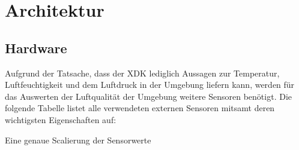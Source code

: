 
\chapter{Architektur}\label{cha:Architektur}
\section{Hardware}\label{sec:Hardware}
Aufgrund der Tatsache, dass der \acs{XDK} lediglich Aussagen zur Temperatur, Luftfeuchtigkeit und dem Luftdruck in der Umgebung liefern kann, werden für das Auswerten der Luftqualität der Umgebung weitere Sensoren benötigt. Die folgende Tabelle listet alle verwendeten externen Sensoren mitsamt deren wichtigsten Eigenschaften auf:
\begin{table}[H]
	\begin{center}
	\end{center}
	\caption{Übersicht Sensoren}
	\label{tab:Sensoren}
\end{table}
Eine genaue Scalierung der Sensorwerte 
